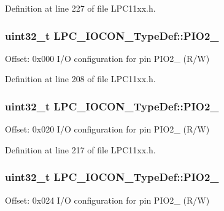 Definition at line 227 of file L\+P\+C11xx.\+h.

\subsubsection[{\texorpdfstring{P\+I\+O2\+\_\+6}{PIO2_6}}]{ uint32\+\_\+t L\+P\+C\+\_\+\+I\+O\+C\+O\+N\+\_\+\+Type\+Def\+::\+P\+I\+O2\+\_}\hypertarget{group___l_p_c11xx___definitions_gaaaca8c6a8f0ee9eadc44aefbcde5999d}{}\label{group___l_p_c11xx___definitions_gaaaca8c6a8f0ee9eadc44aefbcde5999d}
Offset\+: 0x000 I/O configuration for pin P\+I\+O2\+\_ (R/W) 

Definition at line 208 of file L\+P\+C11xx.\+h.

\subsubsection[{\texorpdfstring{P\+I\+O2\+\_\+7}{PIO2_7}}]{ uint32\+\_\+t L\+P\+C\+\_\+\+I\+O\+C\+O\+N\+\_\+\+Type\+Def\+::\+P\+I\+O2\+\_}\hypertarget{group___l_p_c11xx___definitions_ga5c04ca957971220fb2ac40eea7aba0ff}{}\label{group___l_p_c11xx___definitions_ga5c04ca957971220fb2ac40eea7aba0ff}
Offset\+: 0x020 I/O configuration for pin P\+I\+O2\+\_ (R/W) 

Definition at line 217 of file L\+P\+C11xx.\+h.

\subsubsection[{\texorpdfstring{P\+I\+O2\+\_\+8}{PIO2_8}}]{ uint32\+\_\+t L\+P\+C\+\_\+\+I\+O\+C\+O\+N\+\_\+\+Type\+Def\+::\+P\+I\+O2\+\_}\hypertarget{group___l_p_c11xx___definitions_gaf6abe4351486e94939abac7091e20182}{}\label{group___l_p_c11xx___definitions_gaf6abe4351486e94939abac7091e20182}
Offset\+: 0x024 I/O configuration for pin P\+I\+O2\+\_ (R/W) 

